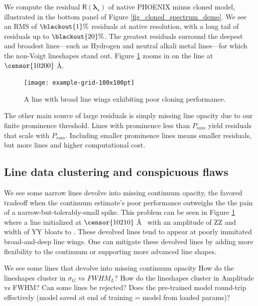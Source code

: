 \documentclass[modern]{aastex631}
\begin{document}
We compute the residual $\mathsf{R}(\bm{\lambda}_s)$ of native PHOENIX minus cloned model, illustrated in the bottom panel of Figure \ref{fig_cloned_spectrum_demo}.  We see an RMS of $\blackout{1}\%$ residuals at native resolution, with a long tail of residuals up to $\blackout{20}\%$.  The greatest residuals surround the deepest and broadest lines---such as Hydrogen and neutral alkali metal lines---for which the non-Voigt lineshapes stand out.  Figure \ref{fig_poor_cloning_performance} zooms in on the  line at $\censor{10200}\;$\AA.

\begin{figure}[hbt!]
  \centering
  \texttt{[image: example-grid-100x100pt]}
  \caption{A  line with broad line wings exhibiting poor cloning performance.}
  \label{fig_poor_cloning_performance}
\end{figure}

The other main source of large residuals is simply missing line opacity due to our finite prominence threshold.  Lines with prominence less than $P_{rom}$ yield residuals that scale with $P_{rom}$.  Including smaller prominence lines means smaller residuals, but more lines and higher computational cost.


\subsection{Line data clustering and conspicuous flaws}
We see some narrow lines devolve into missing continuum opacity, the favored tradeoff when the continuum estimate's poor performance outweighs the the pain of a narrow-but-tolerably-small spike.  This problem can be seen in Figure \ref{fig_poor_cloning_performance} where a line initialized at $\censor{10210}\;$\AA~ with an amplitude of ZZ and width of YY bloats to .  These devolved lines tend to appear at poorly immitated broad-and-deep line wings.  One can mitigate these devolved lines by adding more flexibility to the continuum or supporting more advanced line shapes.


\begin{outline}
  \1 We see some lines that devolve into missing continuum opacity
  \1 How do the lineshapes cluster in $\sigma_G$ vs $FWHM_L$?
  \1 How do the lineshapes cluster in Amplitude vs FWHM? Can some lines be rejected?
  \1 Does the pre-trained model round-trip effectively (model saved at end of training = model from loaded params)?
\end{outline}
\end{document}
